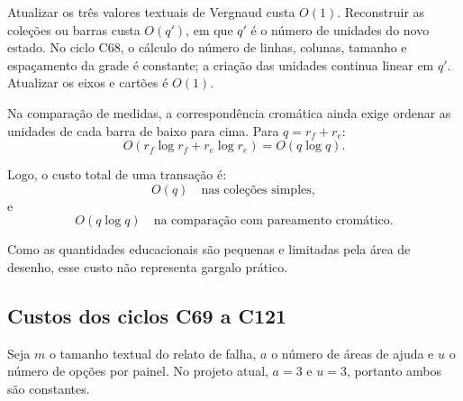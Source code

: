 \documentclass[12pt,a4paper]{article}
\begin{document}
Atualizar os três valores textuais de Vergnaud custa $O(1)$. Reconstruir as coleções ou barras custa $O(q')$, em que $q'$ é o número de unidades do novo estado. No ciclo C68, o cálculo do número de linhas, colunas, tamanho e espaçamento da grade é constante; a criação das unidades continua linear em $q'$. Atualizar os eixos e cartões é $O(1)$.

Na comparação de medidas, a correspondência cromática ainda exige ordenar as unidades de cada barra de baixo para cima. Para $q=r_f+r_e$:
\[
O(r_f\log r_f+r_e\log r_e)=O(q\log q).
\]

Logo, o custo total de uma transação é:
\[
O(q) \quad \text{nas coleções simples},
\]
e
\[
O(q\log q) \quad \text{na comparação com pareamento cromático}.
\]

Como as quantidades educacionais são pequenas e limitadas pela área de desenho, esse custo não representa gargalo prático.

\subsection{Custos dos ciclos C69 a C121}
Seja $m$ o tamanho textual do relato de falha, $a$ o número de áreas de ajuda e $u$ o número de opções por painel. No projeto atual, $a=3$ e $u=3$, portanto ambos são constantes.
\end{document}
